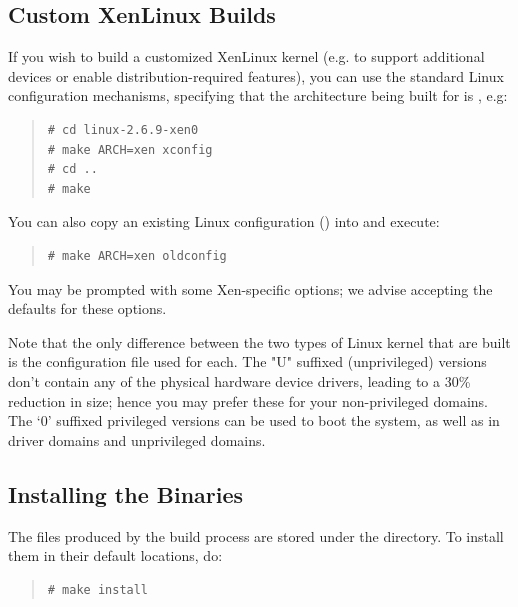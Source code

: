 \documentclass[11pt,twoside,final,openright]{report}
\begin{document}

\subsection{Custom XenLinux Builds}


If you wish to build a customized XenLinux kernel (e.g. to support
additional devices or enable distribution-required features), you can
use the standard Linux configuration mechanisms, specifying that the
architecture being built for is , e.g:
\begin{quote}
\begin{verbatim} 
# cd linux-2.6.9-xen0 
# make ARCH=xen xconfig 
# cd ..
# make
\end{verbatim} 
\end{quote} 

You can also copy an existing Linux configuration () 
into  and execute:  
\begin{quote}
\begin{verbatim} 
# make ARCH=xen oldconfig 
\end{verbatim} 
\end{quote} 

You may be prompted with some Xen-specific options; we 
advise accepting the defaults for these options.

Note that the only difference between the two types of Linux kernel
that are built is the configuration file used for each.  The "U"
suffixed (unprivileged) versions don't contain any of the physical
hardware device drivers, leading to a 30\% reduction in size; hence
you may prefer these for your non-privileged domains.  The `0'
suffixed privileged versions can be used to boot the system, as well
as in driver domains and unprivileged domains.


\subsection{Installing the Binaries}


The files produced by the build process are stored under the
 directory. To install them in their default
locations, do:
\begin{quote}
\begin{verbatim}
# make install
\end{verbatim} 
\end{quote}
\end{document}
